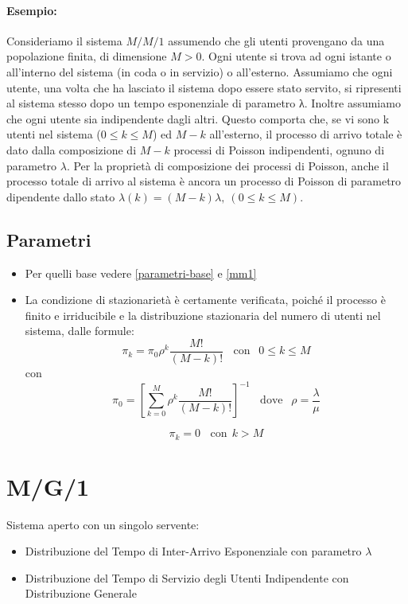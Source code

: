 \paragraph{Esempio:}
Consideriamo il sistema $M/M/1$ assumendo che gli utenti provengano da una
popolazione finita, di dimensione $M>0$. Ogni utente si trova ad ogni istante o
all'interno del sistema (in coda o in servizio) o all'esterno. Assumiamo che
ogni utente, una volta che ha lasciato il sistema dopo essere stato servito, si
ripresenti al sistema stesso dopo un tempo esponenziale di parametro λ. Inoltre
assumiamo che ogni utente sia indipendente dagli altri. Questo comporta che, se
vi sono k utenti nel sistema ($0 \leq k \leq M$) ed $M-k$ all'esterno, il processo di
arrivo totale è dato dalla composizione di $M-k$ processi di Poisson indipendenti,
ognuno di parametro $\lambda$. Per la proprietà di composizione dei processi di Poisson,
anche il processo totale di arrivo al sistema è ancora un processo di Poisson di
parametro dipendente dallo stato $\lambda(k) = (M-k) \lambda, \  (0 \leq k \leq M)$.

\subsection{Parametri}

\begin{itemize}
    \item Per quelli base vedere \ref{parametri-base} e \ref{mm1}
    \item La condizione di stazionarietà è certamente verificata, poiché il processo è finito e irriducibile e la distribuzione
          stazionaria del numero di utenti nel sistema, dalle formule:
          $$\pi_k = \pi_0 \rho^k \frac{M!}{(M-k)!} \ \ \ \ \text{con } \  \ 0 \leq k \leq M$$
          con
          $$\pi_0 = \left [ \sum_{k=0}^{M} \rho^k \frac{M!}{(M-k)!} \right ]^{-1} \ \ \ \ \text{dove } \ \ \rho = \frac{\lambda}{\mu}$$

          $$\pi_k = 0 \ \ \ \ \text{con} \ \ k > M$$
\end{itemize}


\section{M/G/1} \label{mg1}

Sistema aperto con un singolo servente:

\begin{itemize}
    \item Distribuzione del Tempo di Inter-Arrivo Esponenziale con parametro
          $\lambda$
    \item Distribuzione del Tempo di Servizio degli Utenti Indipendente con
          Distribuzione Generale
\end{itemize}


